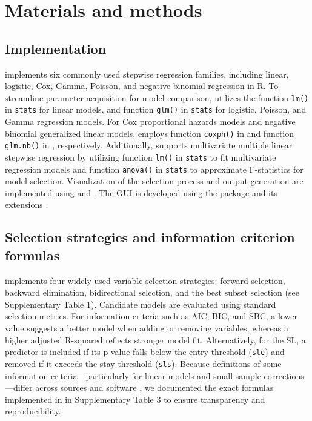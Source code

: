\section{Materials and methods}\label{materials-and-methods}

\subsection{Implementation}\label{implementation}

 implements six commonly used stepwise regression families, including linear, logistic, Cox, Gamma, Poisson, and negative binomial regression in R. To streamline parameter acquisition for model comparison,  utilizes the function \texttt{lm()} in \texttt{stats} for linear models, and function \texttt{glm()} in \texttt{stats} for logistic, Poisson, and Gamma regression models. For Cox proportional hazards models and negative binomial generalized linear models,  employs function \texttt{coxph()} in  \citep{RN88, RN87} and function \texttt{glm.nb()} in  \citep{RN76}, respectively. Additionally,  supports multivariate multiple linear stepwise regression by utilizing function \texttt{lm()} in \texttt{stats} to fit multivariate regression models and function \texttt{anova()} in \texttt{stats} to approximate F-statistics for model selection. Visualization of the selection process and output generation are implemented using  \citep{RN89} and  \citep{RN90}. The GUI is developed using the  \citep{RN91} package and its extensions \citep{RN92, RN94, RN95, RN93}.

\subsection{Selection strategies and information criterion formulas}\label{selection-strategies-and-information-criterion-formulas}

 implements four widely used variable selection strategies: forward selection, backward elimination, bidirectional selection, and the best subset selection (see Supplementary Table 1). Candidate models are evaluated using standard selection metrics. For information criteria such as AIC, BIC, and SBC, a lower value suggests a better model when adding or removing variables, whereas a higher adjusted R-squared reflects stronger model fit. Alternatively, for the SL, a predictor is included if its p-value falls below the entry threshold (\texttt{sle}) and removed if it exceeds the stay threshold (\texttt{sls}). Because definitions of some information criteria---particularly for linear models and small sample corrections---differ across sources and software \citep{RN1, RN10, RN96, RN14}, we documented the exact formulas implemented in  in Supplementary Table 3 to ensure transparency and reproducibility.

